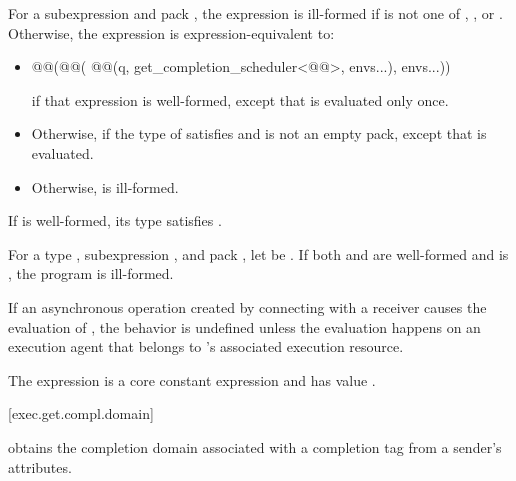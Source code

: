 \pnum
For a subexpression  and pack ,
the expression 
is ill-formed if  is not one of
, , or .
Otherwise, the expression
is expression-equivalent to:
\begin{itemize}
\item
\begin{codeblock}
@@(@@(
  @@(q, get_completion_scheduler<@@>, envs...), envs...))
\end{codeblock}
if that expression is well-formed,
except that  is evaluated only once.
\item
Otherwise, 
if the type of  satisfies  and
 is not an empty pack,
except that  is evaluated.
\item
Otherwise, 
is ill-formed.
\end{itemize}
\mandates
If 
is well-formed,
its type satisfies .

\pnum
For a type , subexpression , and pack ,
let  be
.
If both  and
 are well-formed and
 is ,
the program is ill-formed.

\pnum
If an asynchronous operation
created by connecting  with a receiver 
causes the evaluation of ,
the behavior is undefined
unless the evaluation happens on an execution agent
that belongs to 's associated execution resource.

\pnum
The expression
is a core constant expression and has value .

[exec.get.compl.domain]{}

\pnum
{}
obtains the completion domain associated with a completion tag
from a sender's attributes.

